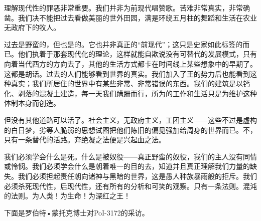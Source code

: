 \begin{scpbox}

理解现代性的罪恶非常重要。我们并非为前现代唱赞歌。苦难非常真实，非常确凿。我们决不能把过去看做美丽的世外田园，满是环绕五月柱的舞蹈和生活在农业无政府下的牧人。

过去是野蛮的，但也是的。它也并非真正的“前现代”；这只是史家如此标签的而已。他们执着于那套现代化的理论，这样就能自欺说没有可替代的发展模式，只有向着当代西方的方向去了，其他的生活方式都卡在时间线上某些想象中的早期了。这都是胡话。过去的人们能够看到世界的真实。我们加入了王的势力后也能看到这种真实；我们所居住的世界中有某些非常、非常错误的东西。我们的建筑是以钙化、剥落的混凝土建造，每一天我们蹒跚而行，所为的工作和生活只是为维护这种体制本身而创造。

但没有其他道路可以活了。社会主义，无政府主义，工团主义——这些不过是虚构的白日梦，劣等人脆弱的思想试图把他们陈旧的偏见强加给周身的世界而已。不，只有一条替代的活路。弃绝凝之法便是兴起血之法。

我们必须学会什么是死。什么是被奴役——真正野蛮的奴役，我们的主人没有同情或怜悯。我们必须学会什么是朝着唯一的目的去，知道并且真正理解我们力量的缺失。我们必须担起责任朝向诸神与黑暗的世界，这是愚人种族暴雨般的拒斥。我们必须杀死现代性，后现代性，还有所有的分析和可笑的观察。只有一条法则。混沌的法则。为人类！为生命！为深红之王！

\end{scpbox}



下面是罗伯特•蒙托克博士对PoI-3172的采访。

